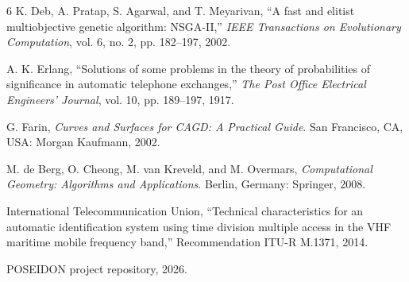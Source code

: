 \documentclass[conference]{IEEEtran}
\begin{document}

\begin{thebibliography}{6}
K. Deb, A. Pratap, S. Agarwal, and T. Meyarivan, ``A fast and elitist multiobjective genetic algorithm: NSGA-II,'' \emph{IEEE Transactions on Evolutionary Computation}, vol. 6, no. 2, pp. 182--197, 2002.

A. K. Erlang, ``Solutions of some problems in the theory of probabilities of significance in automatic telephone exchanges,'' \emph{The Post Office Electrical Engineers' Journal}, vol. 10, pp. 189--197, 1917.

G. Farin, \emph{Curves and Surfaces for CAGD: A Practical Guide}. San Francisco, CA, USA: Morgan Kaufmann, 2002.

M. de Berg, O. Cheong, M. van Kreveld, and M. Overmars, \emph{Computational Geometry: Algorithms and Applications}. Berlin, Germany: Springer, 2008.

International Telecommunication Union, ``Technical characteristics for an automatic identification system using time division multiple access in the VHF maritime mobile frequency band,'' Recommendation ITU-R M.1371, 2014.

POSEIDON project repository, 2026.
\end{thebibliography}
\end{document}
